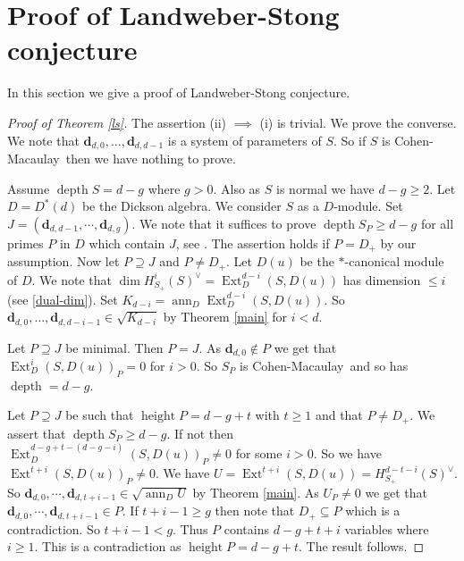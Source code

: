 \documentclass{amsart}
\newcommand{\CM}{Cohen-Macaulay}
\newcommand{\db}{\mathbf{d} }
\newcommand{\depth}{\operatorname{depth}}
\newcommand{\ann}{\operatorname{ann}}
\newcommand{\height}{\operatorname{height}}
\newcommand{\Ext}{\operatorname{Ext}}
\theoremstyle{plain}
\theoremstyle{definition}
\theoremstyle{remark}
\begin{document}
\section{Proof of Landweber-Stong conjecture }
In this section we give a proof of Landweber-Stong conjecture.
\begin{proof}[Proof of Theorem \ref{ls}]
The assertion (ii) $\implies $ (i) is trivial. We prove the converse.
We note that $\db_{d,0},\ldots, \db_{d, d-1}$ is a system of parameters of $S$. So if $S$ is \CM \ then
we have nothing to prove.

Assume $\depth S = d-g$ where $g > 0$. Also as $S$ is normal we have $d - g \geq 2$. Let $D = D^*(d)$ be the Dickson algebra. We consider $S$ as a $D$-module. Set $J =  (\db_{d,d-1}, \cdots, \db_{d,g})$. We note that it suffices to prove $\depth S_P \geq d -g$ for all primes $P$ in $D$ which contain $J$, see \cite[1.2.10]{BH}. The assertion holds if $P = D_+$ by our assumption. Now let $P \supseteq J$ and $P \neq D_+$. Let $D(u)$ be the $*$-canonical module of $D$.
We note that $\dim H^{i}_{S_+}(S)^\vee = \Ext^{d-i}_D(S, D(u))$ has dimension $\leq i$
 (see \ref{dual-dim}).  Set $K_{d-i} = \ann_D \Ext^{d-i}_D(S, D(u))$. So
 $\db_{d,0}, \ldots, \db_{d, d-i-1} \in \sqrt{K_{d-i}}$ by Theorem \ref{main} for $i < d$.

  Let $P \supseteq J$ be minimal. Then $P = J$. As $\db_{d, 0} \notin P$ we get that
  $\Ext^{i}_D(S, D(u))_P = 0$ for $i > 0$. So $S_P$ is \CM \ and so has $\depth  = d -g$.

  Let $P \supseteq J$ be such that $\height P = d - g + t$ with $t \geq 1$ and that $P \neq D_+$. We assert that $\depth S_P \geq d- g$. If not then $\Ext^{d-g + t -(d -g -i)}_D(S, D(u))_P \neq 0$ for some $i > 0$. So we have $\Ext^{t+i}(S, D(u))_P \neq 0$. We have $U = \Ext^{t+i}(S, D(u)) = H^{d - t - i}_{S_+}(S)^\vee$. So $\db_{d,0}, \cdots, \db_{d, t+i -1} \in \sqrt{\ann_D U}$ by Theorem \ref{main}. As $U_P \neq 0$ we get that $\db_{d,0}, \cdots, \db_{d, t+i -1} \in P$. If $t+i -1 \geq g$ then note that $D_+ \subseteq P$ which is a contradiction. So  $t + i -1 < g$.
  Thus  $P$ contains $d - g + t + i$ variables where $i \geq 1$. This is a contradiction as $\height P = d - g + t$. The result follows.
\end{proof}
\end{document}
